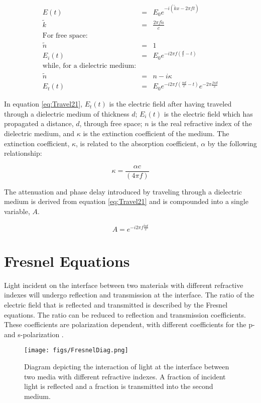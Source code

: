 \begin{eqnarray}
E(t) &=& E_{0}e^{-i(\widetilde{k}x - 2\pi ft)}\label{eq:Travel11}\\
\widetilde{k} &=& \frac{2\pi f \widetilde{n}}{c}\\
\mbox{For free space:}\nonumber\\
\widetilde{n} &=& 1\\
E_{i}(t) &=& E_{0}e^{-i2\pi f(\frac{d}{c} - t)}\\
\mbox{while, for a dielectric medium:}\nonumber\\
\widetilde{n} &=& n - i\kappa\\
E_{t}(t) &=& E_{0}e^{-i2\pi f(\frac{nd}{c} - t)}e^{-2\pi\frac{f\kappa d}{c}}\label{eq:Travel21}
\end{eqnarray}

In equation \ref{eq:Travel21}, $E_{t}(t)$ is the electric field after having traveled through a dielectric medium of thickness $d$; $E_{i}(t)$ is the electric field which has propagated a distance, $d$, through free space; $n$ is the real refractive index of the dielectric medium, and $\kappa$ is the extinction coefficient of the medium.
The extinction coefficient, $\kappa$, is related to the absorption coefficient, $\alpha$ by the following relationship:

\begin{equation}
\kappa = \frac{\alpha c}{(4 \pi f)}
\label{eq:abs}
\end{equation}

The attenuation and phase delay introduced by traveling through a dielectric medium is derived from equation \ref{eq:Travel21} and is compounded into a single variable, $A$.

\begin{equation}
A = e^{-i2\pi f \frac{\widetilde{n}d}{c}}
\label{eq:Travel31}
\end{equation}

\section{Fresnel Equations}
\label{sec:Fresnel}

Light incident on the interface between two materials with different refractive indexes will undergo reflection and transmission at the interface. The ratio of the electric field that is reflected and transmitted is described by the Fresnel equations. The ratio can be reduced to reflection and transmission coefficients. These coefficients are polarization dependent, with different coefficients for the p- and s-polarization \cite{Driscoll-1978}.
\begin{figure}[H]
\begin{center}
	 \texttt{[image: figs/FresnelDiag.png]}
	 \caption[Fresnel diagram]{Diagram depicting the interaction of light at the interface between two media with different refractive indexes. A fraction of incident light is reflected and a fraction is transmitted into the second medium.}
   \label{fig:FresRef}
\end{center}
\end{figure}

